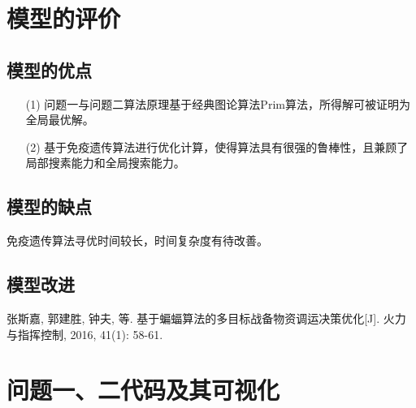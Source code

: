 \documentclass{whutmod}
\begin{document}
  	\section{模型的评价}
		\subsection{模型的优点}
			\begin{itemize}                                             
			\item [(1)]问题一与问题二算法原理基于经典图论算法Prim算法，所得解可被证明为全局最优解。
			\item [(2)] 基于免疫遗传算法进行优化计算，使得算法具有很强的鲁棒性，且兼顾了局部搜素能力和全局搜索能力。
			\end{itemize}
		\subsection{模型的缺点}
         免疫遗传算法寻优时间较长，时间复杂度有待改善。
  		\subsection{模型改进}
        
  
  
 
	\newpage	%
	\nocite{*}		%
	\begin{thebibliography}{9}%
		张斯嘉, 郭建胜, 钟夫, 等. 基于蝙蝠算法的多目标战备物资调运决策优化[J]. 火力与指挥控制, 2016, 41(1): 58-61.
	
	\end{thebibliography}

	\newpage
	\appendix %
	\section{问题一、二代码及其可视化}
\end{document}
